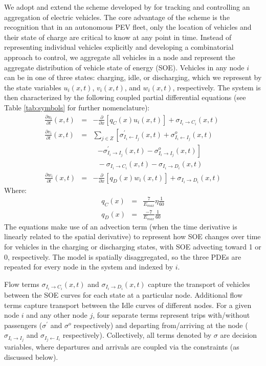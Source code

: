 \documentclass[conference]{IEEEtran}
\begin{document}
We adopt and extend the scheme developed by \cite{lefloch_pde_2016} for tracking and controlling an aggregation of electric vehicles. The core advantage of the scheme is the recognition that in an autonomous PEV fleet, only the location of vehicles and their state of charge are critical to know at any point in time. Instead of representing individual vehicles explicitly and developing a combinatorial approach to control, we aggregate all vehicles in a node and represent the aggregate distribution of vehicle state of energy (SOE). Vehicles in any node $i$ can be in one of three states: charging, idle, or discharging, which we represent by the state variables $u_i(x,t)$, $v_i(x,t)$, and $w_i(x,t)$, respectively. The system is then characterized by the following coupled partial differential equations (see Table \ref{tab:symbols} for further nomenclature):
\begin{eqnarray*}
    \frac{\partial u_i}{\partial t}(x,t) &=& -\frac{\partial}{\partial x}\left[ q_C(x) u_i(x,t) \right] + \sigma_{I_i \rightarrow C_i}(x,t) \\
    \frac{\partial v_i}{\partial t}(x,t) &=& \sum_{j\in Z} \left[ \sigma_{I_i \leftarrow I_j}^\prime(x,t) + \sigma_{I_i \leftarrow I_j}^o(x,t) \right. \\
    & & ~~~ \left. - \sigma_{I_i \rightarrow I_j}^\prime(x,t) - \sigma_{I_i \rightarrow I_j}^o(x,t) \right] \\
    && ~~~ - \sigma_{I_i \rightarrow C_i}(x,t) - \sigma_{I_i \rightarrow D_i}(x,t) \\
    \frac{\partial w_i}{\partial t}(x,t) &=& -\frac{\partial}{\partial x}\left[ q_D(x) w_i(x,t) \right] + \sigma_{I_i \rightarrow D_i}(x,t) 
\end{eqnarray*}
Where: 
\begin{eqnarray*}
q_C(x) &=& \frac{7}{E_{max}}\eta\frac{1}{60} \\
q_D(x) &=& \frac{-7}{E_{max}}\frac{1}{60}
\end{eqnarray*}
The equations make use of an advection term (when the time derivative is linearly related to the spatial derivative) to represent how SOE changes over time for vehicles in the charging or discharging states, with SOE advecting toward 1 or 0, respectively. The model is spatially disaggregated, so the three PDEs are repeated for every node in the system and indexed by $i$.

Flow terms $\sigma_{I_i \rightarrow C_i}(x,t)$ and $\sigma_{I_i \rightarrow D_i}(x,t)$ capture the transport of vehicles between the SOE curves for each state at a particular node. Additional flow terms capture transport between the Idle curves of different nodes. For a given node $i$ and any other node $j$, four separate terms represent trips with/without passengers ($\sigma^\prime$ and $\sigma^o$ respectively) and departing from/arriving at the node ($\sigma_{I_i \rightarrow I_j}$ and $\sigma_{I_j \leftarrow I_i}$ respectively). Collectively, all terms denoted by $\sigma$ are decision variables, where departures and arrivals are coupled via the constraints (as discussed below).
\end{document}
